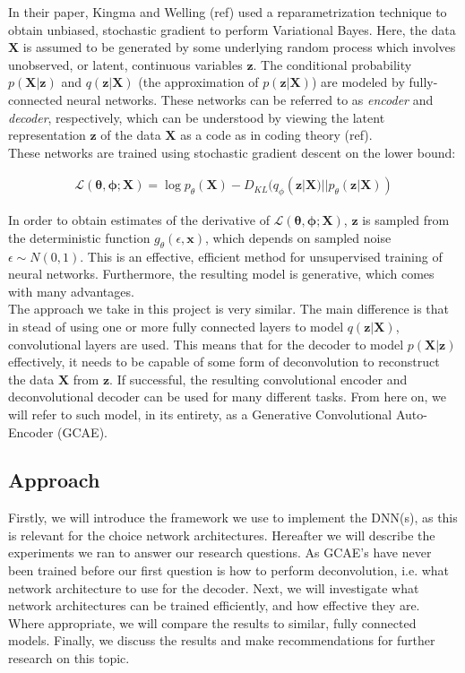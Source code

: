 In their paper, Kingma and Welling (ref) used a reparametrization technique to obtain unbiased, stochastic gradient to perform Variational Bayes. Here, the data $\mathbf{X}$ is assumed to be generated by some underlying random process which involves unobserved, or latent, continuous variables $\mathbf{z}$. The conditional probability $p(\mathbf{X}|\mathbf{z})$ and $q(\mathbf{z}|\mathbf{X})$ (the approximation of $p(\mathbf{z}|\mathbf{X})$) are modeled by fully-connected neural networks. These networks can be referred to as \textit{encoder} and \textit{decoder}, respectively, which can be understood by viewing the latent representation $\mathbf{z}$ of the data $\mathbf{X}$ as a code as in coding theory (ref). \\
These networks are trained using stochastic gradient descent on the lower bound:

\begin{align}
\mathcal{L}(\mathbf{\theta}, \mathbf{\phi}; \mathbf{X}) = \log p_\theta(\mathbf{X}) - D_{KL}(q_\phi(\mathbf{z}|\mathbf{X}) || p_\theta(\mathbf{z}|\mathbf{X}))
\end{align}

In order to obtain estimates of the derivative of $\mathcal{L}(\mathbf{\theta}, \mathbf{\phi}; \mathbf{X})$, $\mathbf{z}$ is sampled from the deterministic function $g_{\theta}(\epsilon,\mathbf{x})$, which depends on sampled noise $\epsilon \sim N(0,1)$. This is an effective, efficient method for unsupervised training of neural networks. Furthermore, the resulting model is generative, which comes with many advantages. \\
The approach we take in this project is very similar. The main difference is that in stead of using one or more fully connected layers to model $q(\mathbf{z}|\mathbf{X})$, convolutional layers are used. This means that for the decoder to model $p(\mathbf{X}|\mathbf{z})$ effectively, it needs to be capable of some form of deconvolution to reconstruct the data $\mathbf{X}$ from $\mathbf{z}$. If successful, the resulting convolutional encoder and deconvolutional decoder can be used for many different tasks. From here on, we will refer to such model, in its entirety, as a Generative Convolutional Auto-Encoder (GCAE).

\subsection{Approach}
Firstly, we will introduce the framework we use to implement the DNN(s), as this is relevant for the choice network architectures. Hereafter we will describe the experiments we ran to answer our research questions. As GCAE's have never been trained before our first question is how to perform deconvolution, i.e. what network architecture to use for the decoder. Next, we will investigate what network architectures can be trained efficiently, and how effective they are. Where appropriate, we will compare the results to similar, fully connected models. Finally, we discuss the results and make recommendations for further research on this topic.
\newpage



